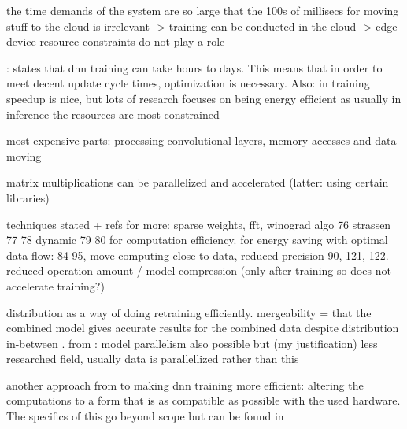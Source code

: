 the time demands of the system are so large that the 100s of millisecs for moving stuff to the cloud is irrelevant -> training can be conducted in the cloud -> edge device resource constraints do not play a role

\cite{szeEfficientProcessingDeep2017}: %
states that dnn training can take hours to days. This means that in order to meet decent update cycle times, optimization is necessary. Also: in training speedup is nice, but lots of research focuses on being energy efficient as usually in inference the resources are most constrained

most expensive parts: processing convolutional layers, memory accesses and data moving

matrix multiplications can be parallelized and accelerated (latter: using certain libraries)

techniques stated + refs for more: sparse weights, fft, winograd algo 76 strassen 77 78 dynamic 79 80 for computation efficiency. for energy saving with optimal data flow: 84-95, move computing close to data, reduced precision 90, 121, 122. reduced operation amount / model compression (only after training so does not accelerate training?)

distribution as a way of doing retraining efficiently. mergeability =  that the combined model gives accurate results for the combined data despite distribution in-between \cite{bifet_machine_2017}. from \cite{ben-nun_demystifying_2019}: model parallelism also possible but (my justification) less researched field, usually data is parallellized rather than this

another approach from \cite{ben-nun_demystifying_2019} to making dnn training more efficient: altering the computations to a form that is as compatible as possible with the used hardware. The specifics of this go beyond scope but can be found in \cite{ben-nun_demystifying_2019}




